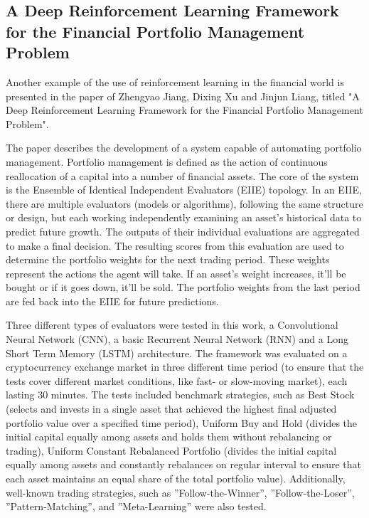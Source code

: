 \documentclass[a4paper,oneside,onecolumn,12pt]{book}
\begin{document}
	\subsection{A Deep Reinforcement Learning Framework for the Financial Portfolio Management Problem \cite{ADRLFFPMP}}\label{paper_ADRLFFPMP}
	Another example of the use of reinforcement learning in the financial world is presented in the paper of Zhengyao Jiang, Dixing Xu and Jinjun Liang, titled "A Deep Reinforcement Learning Framework for the Financial Portfolio Management Problem". 
	
	The paper describes the development of a system capable of automating portfolio management. Portfolio management is defined as the action of continuous reallocation of a capital into a number of financial assets. The core of the system is the Ensemble of Identical Independent Evaluators (EIIE) topology.  In an EIIE, there are multiple evaluators (models or algorithms), following the same structure or design, but each working independently examining an asset's historical data to predict future growth. The outputs of their individual evaluations are aggregated to make a final decision. The resulting scores from this evaluation are used to determine the portfolio weights for the next trading period. These weights represent the actions the agent will take. If an asset's weight increases, it'll be bought or if it goes down, it'll be sold. The portfolio weights from the last period are fed back into the EIIE for future predictions.

	Three different types of evaluators were tested in this work, a Convolutional Neural Network (CNN), a basic Recurrent Neural Network (RNN) and a Long Short Term Memory (LSTM) architecture. The framework was evaluated on a cryptocurrency exchange market in three different time period (to ensure that the tests cover different market conditions, like fast- or slow-moving market), each lasting 30 minutes. The tests included benchmark strategies, such as Best Stock (selects and invests in a single asset that achieved the highest final adjusted portfolio value over a specified time period), Uniform Buy and Hold (divides the initial capital equally among assets and holds them without rebalancing or trading), Uniform Constant Rebalanced Portfolio (divides the initial capital equally among assets and constantly rebalances on regular interval to ensure that each asset maintains an equal share of the total portfolio value). Additionally, well-known trading strategies, such as ”Follow-the-Winner”, ”Follow-the-Loser”, ”Pattern-Matching”, and ”Meta-Learning” were also tested.
\end{document}
